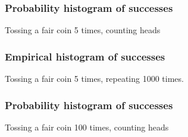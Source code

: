 \documentclass[handout]{beamer}
\begin{document}
   \begin{frame}
   \frametitle{Probability histogram of successes}
   \begin{center}
   \end{center}
   Tossing a fair coin 5 times, counting heads
   \end{frame}



   \begin{frame}
   \frametitle{Empirical histogram of successes}
   \begin{center}
   \end{center}
   Tossing a fair coin 5 times, repeating 1000 times.
   \end{frame}



   \begin{frame}
   \frametitle{Probability histogram of successes}
   \begin{center}
   \end{center}
   Tossing a fair coin 100 times, counting heads
   \end{frame}
\end{document}
